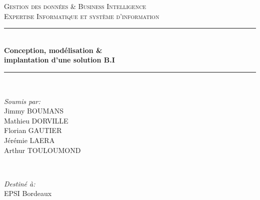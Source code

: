 \makeatletter
\newcommand{\setword}[2]{%
  \phantomsection
  #1\def\@currentlabel{\unexpanded{#1}}\label{#2}%
}
\makeatother



\begin{titlepage}

\newcommand{\HRule}{\rule{\linewidth}{0.5mm}} %

\center %
 

\textsc{\LARGE Gestion des données \& Business Intelligence }\\[0.4cm] %
\textsc{\Large Expertise Informatique et système d'information}\\[0.5cm] %


\HRule \\[0.4cm]
{ \huge \bfseries Conception, modélisation \& \\implantation d'une solution B.I}\\[0.03cm] %
\HRule \\[1.5cm]

 

\begin{minipage}{0.4\textwidth}
\begin{flushleft} \large
\emph{Soumis par:}\\
Jimmy BOUMANS \\Mathieu DORVILLE\\Florian GAUTIER\\Jérémie LAERA\\Arthur TOULOUMOND %
\end{flushleft}
\end{minipage}
~
\begin{minipage}{0.4\textwidth}
\begin{flushright} \large
\emph{Destiné à:} \\
EPSI Bordeaux %
\end{flushright}
\end{minipage}\\[1cm]


\end{titlepage}
